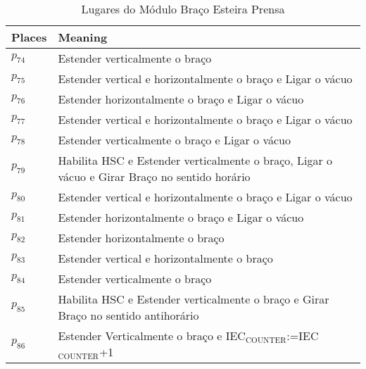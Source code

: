 \begin{table}[htbp]
\caption{Lugares do Módulo Braço Esteira Prensa}
\centering
\begin{tabular}{ll}
Places & Meaning\\
\hline
\hyperlink{partialNet:p74}{\hypertarget{partialTable:p74}{$p_{74}$}} & Estender verticalmente o braço\\
\hyperlink{partialNet:p75}{\hypertarget{partialTable:p75}{$p_{75}$}} & Estender vertical e horizontalmente o braço e Ligar o vácuo\\
\hyperlink{partialNet:p76}{\hypertarget{partialTable:p76}{$p_{76}$}} & Estender horizontalmente o braço e Ligar o vácuo\\
\hyperlink{partialNet:p77}{\hypertarget{partialTable:p77}{$p_{77}$}} & Estender vertical e horizontalmente o braço e Ligar o vácuo\\
\hyperlink{partialNet:p78}{\hypertarget{partialTable:p78}{$p_{78}$}} & Estender verticalmente o braço e Ligar o vácuo\\
\hyperlink{partialNet:p79}{\hypertarget{partialTable:p79}{$p_{79}$}} & Habilita HSC e Estender verticalmente o braço, Ligar o vácuo e Girar Braço no sentido horário\\
\hyperlink{partialNet:p80}{\hypertarget{partialTable:p80}{$p_{80}$}} & Estender vertical e horizontalmente o braço e Ligar o vácuo\\
\hyperlink{partialNet:p81}{\hypertarget{partialTable:p81}{$p_{81}$}} & Estender horizontalmente o braço e Ligar o vácuo\\
\hyperlink{partialNet:p82}{\hypertarget{partialTable:p82}{$p_{82}$}} & Estender horizontalmente o braço\\
\hyperlink{partialNet:p83}{\hypertarget{partialTable:p83}{$p_{83}$}} & Estender vertical e horizontalmente o braço\\
\hyperlink{partialNet:p84}{\hypertarget{partialTable:p84}{$p_{84}$}} & Estender verticalmente o braço\\
\hyperlink{partialNet:p85}{\hypertarget{partialTable:p85}{$p_{85}$}} & Habilita HSC e Estender verticalmente o braço e Girar Braço no sentido antihorário\\
\hyperlink{partialNet:p86}{\hypertarget{partialTable:p86}{$p_{86}$}} & Estender Verticalmente o braço e IEC\(_{\text{COUNTER}}\):=IEC\(_{\text{COUNTER}}\)+1\\
\end{tabular}
\end{table}


